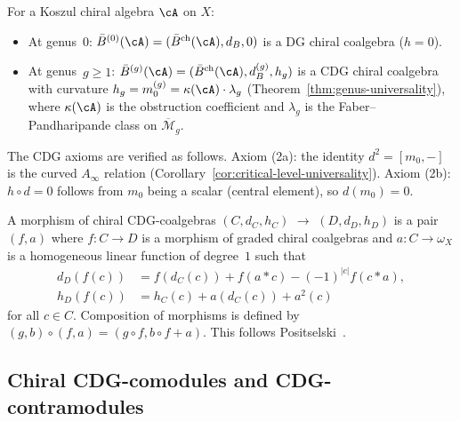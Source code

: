 \begin{example}
\label{ex:bar-as-CDG}
For a Koszul chiral algebra $\cA$ on $X$:
\begin{itemize}
\item At genus~$0$: $\bar{B}^{(0)}(\cA) = (\bar{B}^{\mathrm{ch}}(\cA), d_B, 0)$
  is a DG chiral coalgebra ($h = 0$).
\item At genus~$g \geq 1$: $\bar{B}^{(g)}(\cA) = (\bar{B}^{\mathrm{ch}}(\cA), d_B^{(g)}, h_g)$
  is a CDG chiral coalgebra with curvature
  $h_g = m_0^{(g)} = \kappa(\cA) \cdot \lambda_g$
  (Theorem~\ref{thm:genus-universality}), where $\kappa(\cA)$ is
  the obstruction coefficient and $\lambda_g$ is the Faber--Pandharipande
  class on $\overline{\mathcal{M}}_g$.
\end{itemize}
The CDG axioms are verified as follows.  Axiom (2a): the identity
$d^2 = [m_0, -]$ is the curved $A_\infty$ relation
(Corollary~\ref{cor:critical-level-universality}).
Axiom (2b): $h \circ d = 0$ follows from $m_0$ being a scalar
(central element), so $d(m_0) = 0$.
\end{example}

\begin{remark}
\label{rem:CDG-morphisms}
A morphism of chiral CDG-coalgebras $(C, d_C, h_C)$
$\to$ $(D, d_D, h_D)$ is a pair $(f, a)$ where
$f\colon C \to D$ is a morphism of graded chiral
coalgebras and $a\colon C \to \omega_X$
is a homogeneous linear function of degree~$1$ such
that
\begin{align*}
d_D(f(c)) &= f(d_C(c)) + f(a \ast c) - (-1)^{|c|}f(c \ast a), \\
h_D(f(c)) &= h_C(c) + a(d_C(c)) + a^2(c)
\end{align*}
for all $c \in C$.
Composition of morphisms is defined by
$(g, b) \circ (f, a) = (g \circ f,\allowbreak b \circ f + a)$.
This follows Positselski~\cite[\S4.1]{Positselski11}.
\end{remark}

\subsection{Chiral CDG-comodules and CDG-contramodules}
\label{subsec:chiral-CDG-comod-contra}

